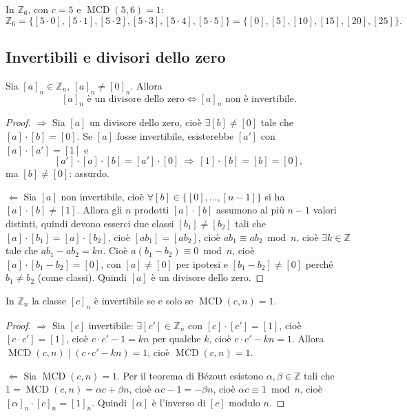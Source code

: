 \documentclass[11pt,a4paper]{article}
\begin{document}
\begin{esempio}
In $\mathbb{Z}_6$, con $c = 5$ e $\operatorname{MCD}(5, 6) = 1$:
\[
  \mathbb{Z}_6 = \{[5\cdot 0], [5\cdot 1], [5\cdot 2], [5\cdot 3], [5\cdot 4], [5\cdot 5]\} = \{[0], [5], [10], [15], [20], [25]\}.
\]
\end{esempio}

\subsection{Invertibili e divisori dello zero}

\begin{proposizione}
Sia $[a]_n \in \mathbb{Z}_n$, $[a]_n \neq [0]_n$. Allora
\[
  [a]_n \text{ è un divisore dello zero} \iff [a]_n \text{ non è invertibile.}
\]
\end{proposizione}

\begin{proof}
$\Rightarrow$ Sia $[a]$ un divisore dello zero, cioè $\exists [b] \neq [0]$ tale che $[a]\cdot[b] = [0]$. Se $[a]$ fosse invertibile, esisterebbe $[a']$ con $[a]\cdot[a'] = [1]$ e
\[
  [a']\cdot[a]\cdot[b] = [a']\cdot[0] \ \Rightarrow\ [1]\cdot[b] = [b] = [0] ,
\]
ma $[b] \neq [0]$: assurdo.

$\Leftarrow$ Sia $[a]$ non invertibile, cioè $\forall [b] \in \{[0], \dots, [n-1]\}$ si ha $[a]\cdot[b] \neq [1]$. Allora gli $n$ prodotti $[a]\cdot[b]$ assumono al più $n - 1$ valori distinti, quindi devono esserci due classi $[b_1] \neq [b_2]$ tali che $[a]\cdot[b_1] = [a]\cdot[b_2]$, cioè $[ab_1] = [ab_2]$, cioè $ab_1 \equiv ab_2 \bmod n$, cioè $\exists k \in \mathbb{Z}$ tale che $ab_1 - ab_2 = kn$. Cioè $a(b_1 - b_2) \equiv 0 \bmod n$, cioè $[a]\cdot[b_1 - b_2] = [0]$, con $[a] \neq [0]$ per ipotesi e $[b_1 - b_2] \neq [0]$ perché $b_1 \neq b_2$ (come classi). Quindi $[a]$ è un divisore dello zero.
\end{proof}

\begin{proposizione}
In $\mathbb{Z}_n$ la classe $[c]_n$ è invertibile se e solo se $\operatorname{MCD}(c, n) = 1$.
\end{proposizione}

\begin{proof}
$\Rightarrow$ Sia $[c]$ invertibile: $\exists [c'] \in \mathbb{Z}_n$ con $[c]\cdot[c'] = [1]$, cioè $[c\cdot c'] = [1]$, cioè $c\cdot c' - 1 = kn$ per qualche $k$, cioè $c\cdot c' - kn = 1$. Allora $\operatorname{MCD}(c, n) \mid (c\cdot c' - kn) = 1$, cioè $\operatorname{MCD}(c, n) = 1$.

$\Leftarrow$ Sia $\operatorname{MCD}(c, n) = 1$. Per il teorema di Bézout esistono $\alpha, \beta \in \mathbb{Z}$ tali che $1 = \operatorname{MCD}(c, n) = \alpha c + \beta n$, cioè $\alpha c - 1 = -\beta n$, cioè $\alpha c \equiv 1 \bmod n$, cioè $[\alpha]_n\cdot[c]_n = [1]_n$. Quindi $[\alpha]$ è l'inverso di $[c]$ modulo $n$.
\end{proof}
\end{document}
